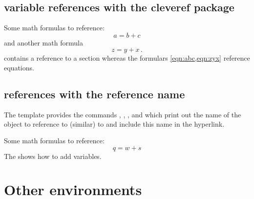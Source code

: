 \subsection{variable references with the cleveref package}

\begin{filecontents*}{\democodefile}
Some math formulas to reference:
\begin{equation}
a = b + c \label{eqn:abc}
\end{equation}
and another math formula
\begin{equation}
z = y + x\,. \label{eqn:zyx}
\end{equation}
 contains a reference to a section
whereas the formulars \cref{eqn:abc,eqn:zyx} 
reference equations.
\end{filecontents*}

%
\subsection{references with the reference name}

The template provides the commands , , ,  and  which print out the name of the object to reference to (similar) to  and include this name in the hyperlink.

\begin{filecontents*}{\democodefile}
Some math formulas to reference:
\begin{equation}
q = w + s \label{eqn:qws}
\end{equation}
%
The  shows how to add variables.
\end{filecontents*}

%

%
\section{Other environments}
